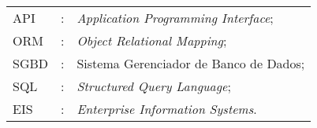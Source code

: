 \cleardoublepage
{}
\begin{tabular}{lcl}

API & : & \textit{Application Programming Interface};\\
ORM & : & \textit{Object Relational Mapping};\\
SGBD & : & Sistema Gerenciador de Banco de Dados;\\
SQL & : & \textit{Structured Query Language};\\
EIS & : & \textit{Enterprise Information Systems}.\\

\end{tabular}
